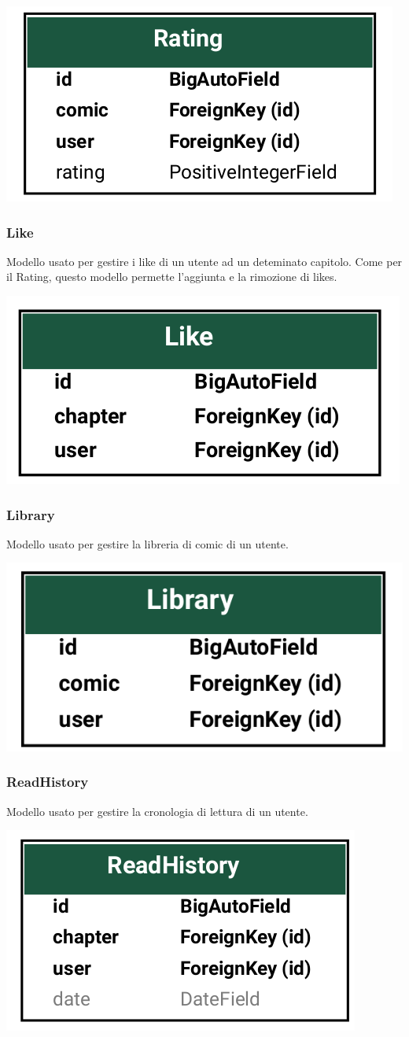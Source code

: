 \begin{center}
  \includegraphics[width=0.4\linewidth]{images/rating.png}
\end{center}

\subsubsection{Like}
Modello usato per gestire i like di un utente ad un deteminato capitolo.
Come per il Rating, questo modello permette l'aggiunta e la rimozione di likes.

\begin{center}
  \includegraphics[width=0.4\linewidth]{images/like.png}
\end{center}

\subsubsection{Library}
Modello usato per gestire la libreria di comic di un utente.

\begin{center}
  \includegraphics[width=0.4\linewidth]{images/library.png}
\end{center}

\subsubsection{ReadHistory}
Modello usato per gestire la cronologia di lettura di un utente.

\begin{center}
  \includegraphics[width=0.4\linewidth]{images/history.png}
\end{center}

